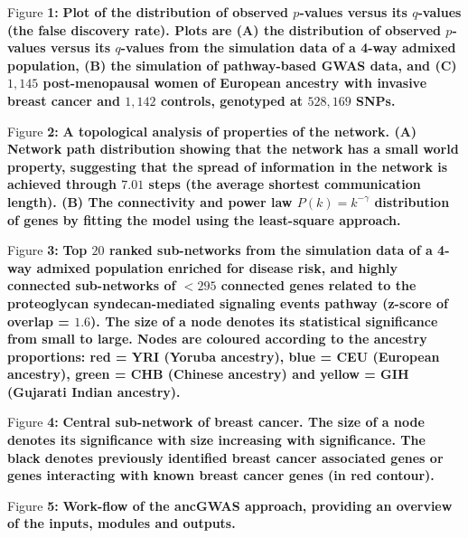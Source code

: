 \documentclass[10pt]{article}
\begin{document}
{\begin{flushleft}
Figure {\bf 1:} {\bf Plot of the distribution of observed $p$-values versus its $q$-values (the false discovery rate). Plots are (A) the distribution of observed $p$-values versus its $q$-values from the simulation data of a 4-way admixed population, (B) the simulation of pathway-based GWAS data, and (C) $1,145$ post-menopausal women of European ancestry with invasive breast cancer and $1,142$ controls, genotyped at $528,169$ SNPs.}
\end{flushleft}

\begin{flushleft}
Figure {\bf 2:} {\bf A topological analysis of properties of the network. (A) Network path distribution showing that the network has a small world property, suggesting that the spread of information in the network is achieved through $7.01$ steps (the average shortest communication length). (B) The connectivity and power law $P\left(k\right)=k^{-\gamma}$ distribution of genes by fitting the model using the least-square approach.}
\end{flushleft}

\begin{flushleft}
Figure {\bf 3:} {\bf Top $20$ ranked sub-networks from the simulation data of a 4-way admixed population enriched for disease risk, and highly connected sub-networks of $<295$ connected genes related to the \textbf{proteoglycan syndecan-mediated signaling events pathway (z-score of overlap = $1.6$)}. The size of a node denotes its statistical significance from small to large. Nodes are coloured according to the ancestry proportions: red = YRI (Yoruba ancestry), blue = CEU (European ancestry), green = CHB (Chinese ancestry) and yellow = GIH (Gujarati Indian ancestry).}
\end{flushleft}

\begin{flushleft}
Figure {\bf 4:} {\bf Central sub-network of breast cancer. The size of a node denotes its significance with size increasing with significance. The black denotes previously identified breast cancer associated genes or genes interacting with known breast cancer genes (in red contour).}
\end{flushleft}

\begin{flushleft}
Figure {\bf 5:} {\bf Work-flow of the ancGWAS approach, providing an overview of the inputs, modules and outputs.}
\end{flushleft}


}
\end{document}
